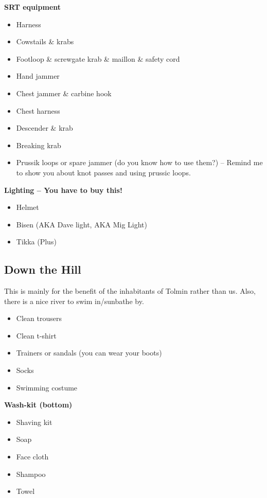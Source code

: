 \textbf{SRT equipment}
\begin{itemize}
    \item Harness
    \item Cowstails \& krabs
    \item Footloop \& screwgate krab \& maillon \& safety cord
    \item Hand jammer
    \item Chest jammer \& carbine hook
    \item Chest harness
    \item Descender \& krab
    \item Breaking krab
    \item Prussik loops or spare jammer (do you know how to use them?) – Remind me to show you about knot passes and using prussic loops.
\end{itemize}
					
\textbf{Lighting – You have to buy this!}
\begin{itemize}
    \item Helmet
    \item Bisen (AKA Dave light, AKA Mig Light)
    \item Tikka (Plus)
\end{itemize}

 
\subsection{Down the Hill}
This is mainly for the benefit of the inhabitants of Tolmin rather than us. Also, there is a nice river to swim in/sunbathe by.
\begin{itemize}
    \item Clean trousers
    \item Clean t-shirt
    \item Trainers or sandals (you can wear your boots)
    \item Socks
    \item Swimming costume
\end{itemize}

\textbf{Wash-kit (bottom)}
\begin{itemize}
    \item Shaving kit
    \item Soap
    \item Face cloth
    \item Shampoo
    \item Towel
\end{itemize}

